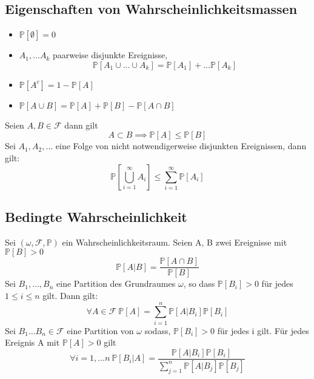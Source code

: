 \subsection{Eigenschaften von Wahrscheinlichkeitsmassen}
\Satz[1.7]
\begin{itemize}
    \item \( \mathbb{P}[\emptyset] = 0\)
    \item \(A_1, \dots A_k\) paarweise disjunkte Ereignisse, \[\mathbb{P}[A_1 \cup \dots \cup A_k] = \mathbb{P}[A_1] + \dots \mathbb{P}[A_k]\]
    \item \( \mathbb{P}[A^c] = 1 - \mathbb{P}[A]\)
    \item \(\mathbb{P}[A \cup B ] = \mathbb{P}[A] + \mathbb{P}[B] - \mathbb{P}[A \cap B]\)
\end{itemize}
\Satz[1.8] Seien \(A,B \in \mathcal{F}\) dann gilt \[ A \subset B \implies \mathbb{P}[A] \leq \mathbb{P}[B]\]
\Satz[1.9] Sei \( A_1, A_2, \dots \) eine Folge von nicht notwendigerweise disjunkten Ereignissen, dann gilt: \[ \mathbb{P}[\bigcup_{i=1}^{\infty} A_i] \leq \sum_{i=1}^{\infty} \mathbb{P}[A_i]\]
\newline \newline \newline
\subsection{Bedingte Wahrscheinlichkeit}
 \newline
Sei \((\omega, \mathcal{F}, \mathbb{P})\) ein Wahrscheinlichkeitsraum. Seien A, B zwei Ereignisse mit \( \mathbb{P}[B] > 0\) \[\mathbb{P}[A|B] = \frac{\mathbb{P}\left[A \cap B\right]}{\mathbb{P}\left[B\right]}\]
 \newline
Sei  \( B_1, \dots , B_n\) eine Partition des Grundraumes \( \omega \), so dass \( \mathbb{P}[B_i] > 0 \) für jedes \( 1 \leq i \leq n\) gilt. Dann gilt: \[\forall A \in  \mathcal{F} \ \mathbb{P}[A] = \sum_{i=1}^{n} \mathbb{P} \left[A | B_i \right] \mathbb{P}[B_i]\]
 \newline
Sei \( B_1 \dots B_n \in \mathcal{F }\) eine Partition von \( \omega\) sodass, \( \mathbb{P}[B_i] > 0 \) für jedes i gilt. Für jedes Ereignis A mit \( \mathbb{P}[A] > 0 \) gilt  \[ \forall i = 1, \dots n \ \mathbb{P}\left[ B_i | A \right] = \frac{\mathbb{P}[A | B_i] \mathbb{P}[B_i]}{\sum_{j=1}^{n} \mathbb{P}[A | B_j] \mathbb{P}[B_j] }\]
